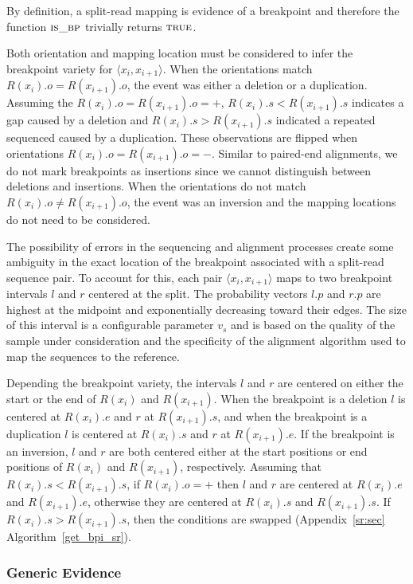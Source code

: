 \documentclass[10pt]{bmc_article}
\newenvironment{bmcformat}{\begin{raggedright}\baselineskip20pt\sloppy\setboolean{publ}{false}}{\end{raggedright}\baselineskip20pt\sloppy}
\begin{document}
\begin{bmcformat}
By definition, a split-read mapping is evidence of a breakpoint and therefore
the function $\textsc{is\_bp}$ trivially returns $\textsc{true}$.

Both orientation and mapping location must be considered to infer the breakpoint
variety for $\langle x_i,x_{i+1} \rangle$.  When the orientations match
$R(x_{i}).o=R(x_{i+1}).o$, the event was either a deletion or
a duplication.  Assuming the $R(x_{i}).o=R(x_{i+1}).o=+$,
$R(x_{i}).s<R(x_{i+1}).s$ indicates a gap caused by a deletion and
$R(x_{i}).s>R(x_{i+1}).s$ indicated a repeated sequenced caused by a
duplication.   These observations are flipped when orientations
$R(x_{i}).o=R(x_{i+1}).o=-$.  Similar to paired-end alignments, we do not mark
breakpoints as insertions since we cannot distinguish between deletions
and insertions.  When the orientations do not match $R(x_{i}).o \ne
R(x_{i+1}).o$, the event was an inversion and the mapping locations do not need
to be considered.

The possibility of errors in the sequencing and alignment processes create some
ambiguity in the exact location of the breakpoint associated with a split-read
sequence pair.  To account for this, each pair $\langle x_i, x_{i+1} \rangle$
maps to two breakpoint intervals $l$ and $r$ centered at the split. The
probability vectors $l.p$ and $r.p$ are highest at the midpoint and
exponentially decreasing toward their edges.  The size of this interval is a
configurable parameter $v_s$ and is based on the quality of the sample under
consideration and the specificity of the alignment algorithm used to map the
sequences to the reference.

Depending the breakpoint variety, the intervals $l$ and $r$ are centered on
either the start or the end of $R(x_i)$ and $R(x_{i+1})$.  When the breakpoint
is a deletion $l$ is centered at $R(x_i).e$ and $r$ at $R(x_{i+1}).s$, and when
the breakpoint is a duplication $l$ is centered at $R(x_i).s$ and $r$ at
$R(x_{i+1}).e$.  If the breakpoint is an inversion, $l$ and $r$ are both
centered either at the start positions or end positions of $R(x_i)$ and
$R(x_{i+1})$, respectively.  Assuming that $R(x_i).s<R(x_{i+1}).s$, if
$R(x_i).o=+$ then $l$ and $r$ are centered at $R(x_i).e$ and  $R(x_{i+1}).e$,
otherwise they are centered at $R(x_i).s$ and  $R(x_{i+1}).s$.  If
$R(x_i).s>R(x_{i+1}).s$, then the conditions are swapped
(Appendix~\ref{sr:sec} Algorithm~\ref{get_bpi_sr}).

\subsubsection*{Generic Evidence}


\end{bmcformat}
\end{document}
